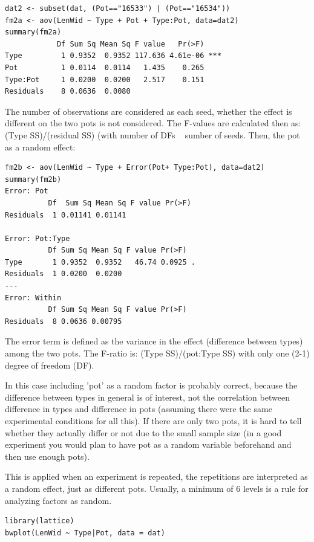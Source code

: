 \documentclass{article}
\begin{document}
\begin{lstlisting}
dat2 <- subset(dat, (Pot=="16533") | (Pot=="16534"))
fm2a <- aov(LenWid ~ Type + Pot + Type:Pot, data=dat2)
summary(fm2a)
            Df Sum Sq Mean Sq F value   Pr(>F)    
Type         1 0.9352  0.9352 117.636 4.61e-06 ***
Pot          1 0.0114  0.0114   1.435    0.265    
Type:Pot     1 0.0200  0.0200   2.517    0.151    
Residuals    8 0.0636  0.0080   
\end{lstlisting}

The number of observations are considered as each seed, whether the effect is different on the two pots is not considered. The F-values are calculated then as: (Type SS)/(residual SS) (with number of DFs ~ sumber of seeds.
Then, the pot as a random effect:

\begin{lstlisting}
fm2b <- aov(LenWid ~ Type + Error(Pot+ Type:Pot), data=dat2)
summary(fm2b)
Error: Pot
          Df  Sum Sq Mean Sq F value Pr(>F)
Residuals  1 0.01141 0.01141               

Error: Pot:Type
          Df Sum Sq Mean Sq F value Pr(>F)  
Type       1 0.9352  0.9352   46.74 0.0925 .
Residuals  1 0.0200  0.0200                 
---
Error: Within
          Df Sum Sq Mean Sq F value Pr(>F)
Residuals  8 0.0636 0.00795 
\end{lstlisting}

The error term is defined as the variance in the effect (difference between types) among the two pots. The F-ratio is: (Type SS)/(pot:Type SS) with only one (2-1) degree of freedom (DF).\par 
In this case including 'pot' as a random factor is probably correct, because the difference between types in general is of interest, not the correlation between difference in types and difference in pots (assuming there were the same experimental conditions for all this). If there are only two pots, it is hard to tell whether they actually differ or not due to the small sample size (in a good experiment you would plan to have pot as a random variable beforehand and then use enough pots).\par 
This is applied when an experiment is repeated, the repetitions are interpreted as a random effect, just as different pots. Usually, a minimum of 6 levels is a rule for analyzing factors as random.

\begin{lstlisting}
library(lattice)
bwplot(LenWid ~ Type|Pot, data = dat)
\end{lstlisting}
\end{document}
